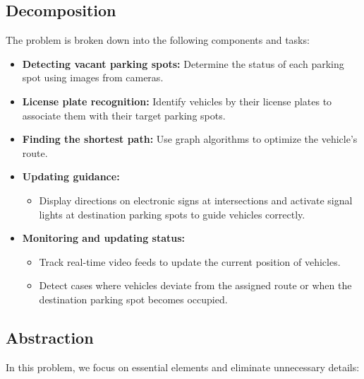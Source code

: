 \documentclass{article}
\begin{document}
\begin{itemize}[label=-]
\subsection{Decomposition}
The problem is broken down into the following components and tasks:

\begin{itemize}[label=-]
    \item \textbf{Detecting vacant parking spots:} \newline
    Determine the status of each parking spot using images from cameras.

    \item \textbf{License plate recognition:} \newline
    Identify vehicles by their license plates to associate them with their target parking spots.

    \item \textbf{Finding the shortest path:} \newline
    Use graph algorithms to optimize the vehicle's route.

    \item \textbf{Updating guidance:}
    \begin{itemize}
        \item Display directions on electronic signs at intersections and activate signal lights at destination parking spots to guide vehicles correctly.
    \end{itemize}

    \item \textbf{Monitoring and updating status:}
    \begin{itemize}
        \item Track real-time video feeds to update the current position of vehicles.
        \item Detect cases where vehicles deviate from the assigned route or when the destination parking spot becomes occupied.
    \end{itemize}
\end{itemize}

\subsection{Abstraction}

In this problem, we focus on essential elements and eliminate unnecessary details:


\end{itemize}
\end{document}
